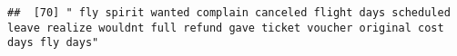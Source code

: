 \documentclass[
]{article}
\begin{document}
\begin{verbatim}
##  [70] " fly spirit wanted complain canceled flight days scheduled leave realize wouldnt full refund gave ticket voucher original cost days fly days"                                                                                                                                                                                                                                                                                                                                                                                                                                                                                                                                                                                                                                                                                                                                                                                                                                                                                                                                                                                                                                                                                                                                                                                                                                                                                                                                                                                                                                                                                                                                                                                                                                                  

\end{verbatim}
\end{document}
